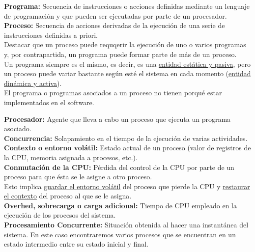 \documentclass[spanish, 12pt]{article}
\begin{document}
			\textbf{Programa:} Secuencia de instrucciones o acciones definidas mediante un lenguaje de programación y que pueden ser ejecutadas por parte de un procesador.\\
			
			\textbf{Proceso:} Secuencia de acciones derivadas de la ejecución de una serie de instrucciones definidas a priori.\\
			
			Destacar que un proceso puede requqerir la ejecución de uno o varios programas y, por contrapartida, un programa puede formar parte de más de un proceso.\\
			
			Un programa siempre es el mismo, es decir, es una \underline{entidad estática y pasiva}, pero un proceso puede variar bastante según esté el sistema en cada momento (\underline{entidad dinámica y activa}).\\
			
			El programa o programas asociados a un proceso no tienen porqué estar implementados en el software.\\
			
			\newpage
			
			\textbf{Procesador:} Agente que lleva a cabo un proceso que ejecuta un programa asociado.\\
			
			\textbf{Concurrencia:} Solapamiento en el tiempo de la ejecución de varias actividades.\\
			
			\textbf{Contexto o entorno volátil:} Estado actual de un proceso (valor de registros de la CPU, memoria asignada a procesos, etc.).\\
			
			\textbf{Conmutación de la CPU:} Pérdida del control de la CPU por parte de un proceso para que ésta se le asigne a otro proceso.\\
			
			Esto implica \underline{guardar el entorno volátil} del proceso que pierde la CPU y \underline{restaurar el contexto} del proceso al que se le asigna.\\
			
			\textbf{Overhed, sobrecarga o carga adicional:} Tiempo de CPU empleado en la ejecución de los procesos del sistema.\\
			
			\textbf{Procesamiento Concurrente:} Situación obtenida al hacer una instantánea del sistema. En este caso encontraremos varios procesos que se encuentran en un estado intermedio entre su estado inicial y final.\\
			
\end{document}
